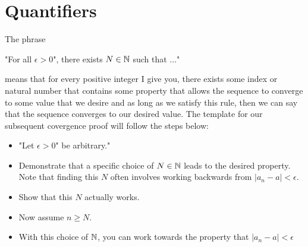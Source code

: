 \section{Quantifiers}

The phrase 

\begin{center}
"For all \( \epsilon> 0 \)", there exists \( N \in \mathbb{N} \) such that ..."
\end{center}

means that for every positive integer I give you, there exists some index or natural number that contains some property that allows the sequence to converge to some value that we desire and as long as we satisfy this rule, then we can say that the sequence converges to our desired value. The template for our subsequent covergence proof will follow the steps below:

\begin{itemize}
    \item "Let \( \epsilon> 0 \)" be arbitrary."
    \item Demonstrate that a specific choice of \( N \in \mathbb{N} \) leads to the desired property. Note that finding this \( N \) often involves working backwards from \( |a_n - a | < \epsilon \). 
    \item Show that this \( N \) actually works.
    \item Now assume \( n \geq N \). 
    \item With this choice of \( \mathbb{N} \), you can work towards the property that \( |a_n - a | < \epsilon \)
\end{itemize}

